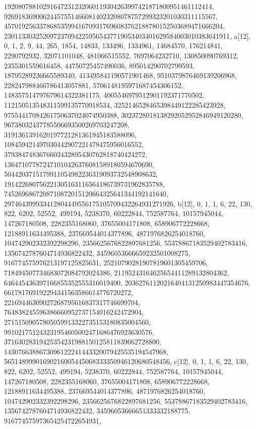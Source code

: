 {{{   19208078810291647231232060119304263997421871800951461112414, 
   926918369006244575514660814023208078757299323201030311115567, 
   45701925633786853599416709317696083762188780152503689471666204, 
   2301133032520972370942259565437719053403401629584003010383641911}}, 
 {a[12], {0, 1, 2, 9, 44, 265, 1854, 14833, 133496, 1334961, 14684570, 
   176214841, 2290792932, 32071101048, 481066515552, 7697064232710, 
   130850090769312, 2355301559616458, 44750725457490036, 895014290702799593, 
   18795289236665589340, 413495841190571901468, 9510379876469139206968, 
   228247988466786413057881, 5706148195971687454306152, 
   148357514797679614322381175, 4005546979512901192371770502, 
   112150513548311599135770918534, 3252146528465398449122285423928, 
   97554417084261750637024074950388, 3023728018138292052952846949120280, 
   96738032437785506693500269703247208, 
   3191361391620197721281361945183588096, 
   108459421497030442907221478475956016552, 
   3793847483676603432895430762818740424272, 
   136471077872471010426376081589180594670690, 
   5044203715179911054982236319093732548908632, 
   191422680756221305163116564186739731962835788, 
   7452696867208710872015120664325641344192141640, 
   297464399933412804449556175105709432264931271926}}, 
 {b[12], {0, 1, 1, 6, 22, 130, 822, 6202, 52552, 499194, 5238370, 60222844, 
   752587764, 10157945044, 147267180508, 2282355168060, 37655004171808, 
   658906772228668, 12188911634495388, 237669544014377896, 
   4871976826254018760, 104742902332392298296, 2356625676822897681256, 
   55378867183529402783416, 1356742787604714936822432, 
   34596053666659232501008275, 916774575976213197125825631, 
   25210790281907819601305459706, 718494507734683072084792024386, 
   21195243164625654411289132804362, 646445436397166855352555316019400, 
   20362761120216404131250983447354676, 661781769192294341563586614776720272, 
   22169446309027268795616837317746699704, 
   764838245596386660952737154016242472904, 
   27151509057805059913322735153180835004560, 
   991021751243231954605002471686476923630576, 
   37163028319425354231988150125811839662728800, 
   1430766388673096122241443320079425535194547968, 
   56514899901690216005445068333350946120680548456}}, 
 {c[12], {0, 1, 1, 6, 22, 130, 822, 6202, 52552, 499194, 5238370, 60222844, 
   752587764, 10157945044, 147267180508, 2282355168060, 37655004171808, 
   658906772228668, 12188911634495388, 237669544014377896, 
   4871976826254018760, 104742902332392298296, 2356625676822897681256, 
   55378867183529402783416, 1356742787604714936822432, 
   34596053666651333332188775, 916774575973654254722654931, 
}}}
